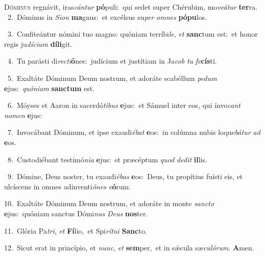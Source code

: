 \lettrine{\initial\textcolor{\initialcolor}{D}}{óminus} regnávit, iras\-\textit{cán}\-\textit{tur} \textbf{pó}\-puli:~\star qui sedet super Chérubim, mo\-\textit{ve}\-\textit{á}\textit{tur} \textbf{ter}\-ra.\\
{\numbfont\textcolor{\numbcolor}{~2.}}~Dóminus in \textit{Si}\-\textit{on} \textbf{ma}\-gnus:~\star et excélsus su\textit{per} \textit{om}\-\textit{nes} \textbf{pó}\-\textbf{pu}los.\par
{\numbfont\textcolor{\numbcolor}{~3.}}~Confiteántur nómini tuo magno: quóniam terríbi\-\textit{le}\-, \textit{et} \textbf{sanc}\-tum est:~\star et honor regis ju\-\textit{dí}\-\textit{ci}\textit{um} \textbf{dí}\-\textbf{li}git.\par
{\numbfont\textcolor{\numbcolor}{~4.}}~Tu parásti di\-\textit{rec}\-\textit{ti}\textbf{ó}nes:~\star judícium et justítiam in Ja\textit{cob} \textit{tu} \textit{fe}\-\textbf{cís}ti.\par
{\numbfont\textcolor{\numbcolor}{~5.}}~Exaltáte Dóminum Deum nostrum, et adoráte scabéllum \textit{pe}\-\textit{dum} \textbf{e}\-jus:~\star \textit{quón}\-\textit{i}\textit{am} \textbf{sanc}\-\textbf{tum} est.\par
{\numbfont\textcolor{\numbcolor}{~6.}}~Móyses et Aaron in sacerdó\-\textit{ti}\-\textit{bus} \textbf{e}\-jus:~\star et Sámuel inter eos, qui ínvo\textit{cant} \textit{no}\-\textit{men} \textbf{e}\-jus:\par
{\numbfont\textcolor{\numbcolor}{~7.}}~Invocábant Dóminum, et ipse exaudi\-\textit{é}\-\textit{bat} \textbf{e}\-os:~\star in colúmna nubis loque\-\textit{bá}\-\textit{tur} \textit{ad} \textbf{e}\-os.\par
{\numbfont\textcolor{\numbcolor}{~8.}}~Custodiébant testimó\-\textit{ni}\-\textit{a} \textbf{e}\-jus:~\star et præcéptum \textit{quod} \textit{de}\-\textit{dit} \textbf{il}\-lis.\par
{\numbfont\textcolor{\numbcolor}{~9.}}~Dómine, Deus noster, tu exaudi\-\textit{é}\-\textit{bas} \textbf{e}\-os:~\star Deus, tu propítius fuísti eis, et ulcíscens in omnes adinventi\-\textit{ó}\-\textit{nes} \textit{e}\-\textbf{ó}rum.\par
{\numbfont\textcolor{\numbcolor}{10.}}~Exaltáte Dóminum Deum nostrum, et adoráte in monte \textit{sanc}\-\textit{to} \textbf{e}\-jus:~\star quóniam sanctus Dómi\textit{nus} \textit{De}\-\textit{us} \textbf{nos}\-ter.\par
{\numbfont\textcolor{\numbcolor}{11.}}~Glória Pa\-\textit{tri}\-, \textit{et} \textbf{Fí}\-lio,~\star et Spi\-\textit{rí}\-\textit{tu}\textit{i} \textbf{Sanc}\-to.\par
{\numbfont\textcolor{\numbcolor}{12.}}~Sicut erat in princípio, et \textit{nunc}\-, \textit{et} \textbf{sem}\-per,~\star et in sǽcula sæ\-\textit{cu}\-\textit{ló}\textit{rum}. \textbf{A}\-men.\par
